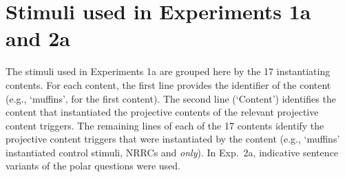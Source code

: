\documentclass[11pt,fleqn]{article}
\newcommand{\6}{\mbox{$[\hspace*{-.6mm}[$}}
\newcommand{\9}{\mbox{$]\hspace*{-.6mm}]$}}
\begin{document}
\appendix

\section{Stimuli used in Experiments 1a and 2a}\label{a-exp1a-2a-stimuli}

The stimuli used in Experiments 1a are grouped here by the 17 instantiating contents. For each content, the first line provides the identifier of the content (e.g., `muffins', for the first content). The second line (`Content') identifies the content that instantiated the projective contents of the relevant projective content triggers. The remaining lines of each of the 17 contents identify the projective content triggers that were instantiated by the content (e.g., `muffins' instantiated control stimuli, NRRCs and {\em only}). In Exp.~2a, indicative sentence variants of the polar questions were used.
\end{document}
